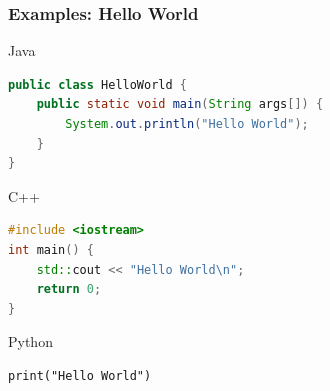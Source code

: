 \documentclass[10pt, a4paper]{beamer} %
\begin{document}
\begin{frame}\frametitle{Examples: Hello World}
    \begin{block}{Java}
    {
    \begin{lstlisting}[language=Java]
public class HelloWorld {
    public static void main(String args[]) {
        System.out.println("Hello World");
    }
}
    \end{lstlisting}    
    }
    \end{block}
    
    \begin{block}{C++}
    {
    \begin{lstlisting}[language=C++, morekeywords=include]
#include <iostream>
int main() {
    std::cout << "Hello World\n";
    return 0;
}
    \end{lstlisting}    
    }
    \end{block}
    \framebreak
    \begin{block}{Python}
        \begin{lstlisting}
print("Hello World")
        \end{lstlisting}
    \end{block}
    
\end{frame}
\end{document}
